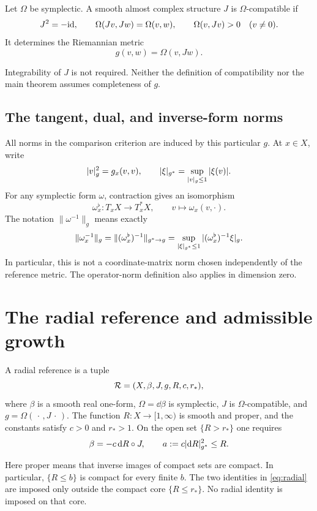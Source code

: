 \begin{definition}
Let $\Omega$ be symplectic. A smooth almost complex structure $J$
is $\Omega$-compatible if
\[
 J^2=-\mathrm{id},\qquad \Omega(Jv,Jw)=\Omega(v,w),\qquad
 \Omega(v,Jv)>0\quad(v\ne0).
\]
It determines the Riemannian metric
\[
 g(v,w)=\Omega(v,Jw).
\]
\end{definition}
Integrability of $J$ is not required. Neither the definition of
compatibility nor the main theorem assumes completeness of $g$.

\subsection{The tangent, dual, and inverse-form norms}
All norms in the comparison criterion are induced by this particular
$g$. At $x\in X$, write
\[
 |v|_g^2=g_x(v,v),\qquad
 |\xi|_{g^*}=\sup_{|v|_g\le1}|\xi(v)|.
\]
For any symplectic form $\omega$, contraction gives an isomorphism
\[
 \omega_x^\flat:T_xX\longrightarrow T_x^*X,\qquad
 v\longmapsto\omega_x(v,\cdot).
\]
The notation $\|\omega^{-1}\|_g$ means exactly
\begin{equation}\label{eq:inversenorm}
 \|\omega_x^{-1}\|_g
 =\|(\omega_x^\flat)^{-1}\|_{g^*\to g}
 =\sup_{|\xi|_{g^*}\le1}|(\omega_x^\flat)^{-1}\xi|_g .
\end{equation}
In particular, this is not a coordinate-matrix norm chosen independently
of the reference metric. The operator-norm definition also applies in
dimension zero.

\section{The radial reference and admissible growth}
\begin{definition}\label{def:reference}
A radial reference is a tuple
\[
 \mathcal R=(X,\beta,J,g,R,c,r_*),
\]
where $\beta$ is a smooth real one-form, $\Omega=\dd\beta$ is
symplectic, $J$ is $\Omega$-compatible, and
$g=\Omega(\,\cdot\,,J\,\cdot\,)$.
The function $R:X\to[1,\infty)$ is smooth and proper, and the constants
satisfy $c>0$ and $r_*>1$. On the open set $\{R>r_*\}$ one requires
\begin{equation}\label{eq:radial}
 \beta=-c\,\mathrm d R\circ J,\qquad
 a:=c|\mathrm d R|_{g^*}^2\le R.
\end{equation}
\end{definition}
Here proper means that inverse images of compact sets are compact.
In particular, $\{R\le b\}$ is compact for every finite $b$.
The two identities in \eqref{eq:radial} are imposed only outside
the compact core $\{R\le r_*\}$. No radial identity is imposed on
that core.

